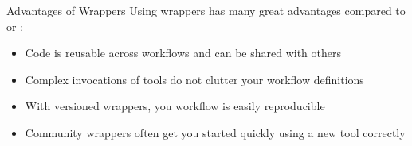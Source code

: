  \begin{frame}{Advantages of Wrappers}
     Using wrappers has many great advantages compared to  or :
     \begin{itemize}[<+->]
         \item Code is reusable across workflows and can be shared with others
         \item Complex invocations of tools do not clutter your \Snakemake{} workflow definitions
         \item With versioned wrappers, you workflow is easily reproducible
         \item Community wrappers often get you started quickly using a new tool correctly
     \end{itemize}
 \end{frame}
